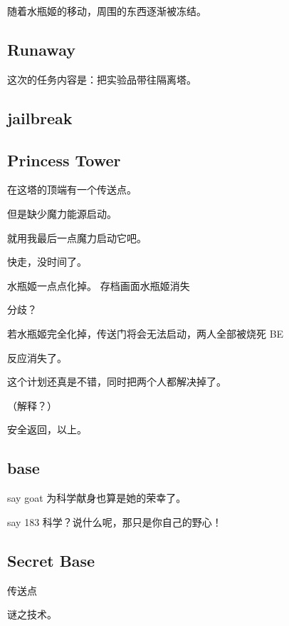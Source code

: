 \documentclass{article}
\begin{document}
随着水瓶姬的移动，周围的东西逐渐被冻结。

\subsection{Runaway}

这次的任务内容是：把实验品带往隔离塔。

\subsection{jailbreak}

\subsection{Princess Tower}

在这塔的顶端有一个传送点。

但是缺少魔力能源启动。

就用我最后一点魔力启动它吧。

快走，没时间了。

水瓶姬一点点化掉。 存档画面水瓶姬消失

分歧？

若水瓶姬完全化掉，传送门将会无法启动，两人全部被烧死 BE

反应消失了。

这个计划还真是不错，同时把两个人都解决掉了。

（解释？）

安全返回，以上。

\subsection{base}

say goat 为科学献身也算是她的荣幸了。

say 183 科学？说什么呢，那只是你自己的野心！

\subsection{Secret Base}

传送点

谜之技术。
\end{document}
